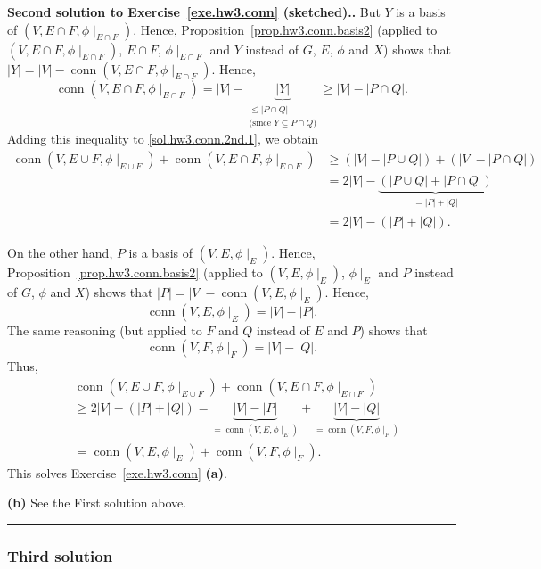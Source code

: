 \documentclass[numbers=enddot,12pt,final,onecolumn,notitlepage]{scrartcl}%
\theoremstyle{definition}
\newenvironment{proof}[1][Proof]{\noindent\textbf{#1.} }{\ \rule{0.5em}{0.5em}}
\newcommand{\conn}{\operatorname{conn}}
\newcommand{\abs}[1]{\left| #1 \right|}
\newcommand{\tup}[1]{\left( #1 \right)}
\newcommand{\underbrack}[2]{\underbrace{#1}_{\substack{#2}}}
\begin{document}
\begin{proof}[Second solution to Exercise~\ref{exe.hw3.conn}
 (sketched).]
But $Y$ is a basis of $\tup{V, E \cap F, \phi\mid_{E \cap F}}$.
Hence, Proposition~\ref{prop.hw3.conn.basis2} (applied to
$\tup{V, E \cap F, \phi\mid_{E \cap F}}$, $E \cap F$,
$\phi\mid_{E \cap F}$ and $Y$ instead of $G$,
$E$, $\phi$ and $X$) shows that
$\abs{Y} = \abs{V} - \conn \tup{V, E \cap F, \phi\mid_{E \cap F}}$.
Hence,
\[
\conn \tup{V, E \cap F, \phi\mid_{E \cap F}}
= \abs{V} - \underbrack{\abs{Y}}
                       {\leq \abs{P \cap Q} \\
                        \text{(since } Y \subseteq P \cap Q \text{)}}
\geq \abs{V} - \abs{P \cap Q} .
\]
Adding this inequality to \eqref{sol.hw3.conn.2nd.1}, we obtain
\begin{align*}
\conn \tup{V, E \cup F, \phi\mid_{E \cup F}}
+ \conn \tup{V, E \cap F, \phi\mid_{E \cap F}}
&\geq \tup{ \abs{V} - \abs{P \cup Q} }
      + \tup{ \abs{V} - \abs{P \cap Q} } \\
&= 2 \abs{V} - \underbrack{\tup{ \abs{P \cup Q} + \abs{P \cap Q} }}
                          {= \abs{P} + \abs{Q}} \\
&= 2 \abs{V} - \tup{\abs{P} + \abs{Q}} .
\end{align*}

On the other hand, $P$ is a basis of $\tup{V, E, \phi\mid_E}$.
Hence, Proposition~\ref{prop.hw3.conn.basis2} (applied to
$\tup{V, E, \phi\mid_E}$, $\phi\mid_E$ and $P$ instead of $G$,
$\phi$ and $X$) shows that
$\abs{P} = \abs{V} - \conn \tup{V, E, \phi\mid_E}$.
Hence,
\[
\conn \tup{V, E, \phi\mid_E} = \abs{V} - \abs{P} .
\]
The same reasoning (but applied to $F$ and $Q$ instead of $E$
and $P$) shows that
\[
\conn \tup{V, F, \phi\mid_F} = \abs{V} - \abs{Q} .
\]
Thus,
\begin{align*}
& \conn \tup{V, E \cup F, \phi\mid_{E \cup F}}
+ \conn \tup{V, E \cap F, \phi\mid_{E \cap F}} \\
&\geq 2 \abs{V} - \tup{\abs{P} + \abs{Q}}
= \underbrace{\abs{V} - \abs{P}}_{= \conn \tup{V, E, \phi\mid_E}}
  + \underbrace{\abs{V} - \abs{Q}}_{= \conn \tup{V, F, \phi\mid_F}}
\\
&= \conn \tup{V, E, \phi\mid_E}
+ \conn \tup{V, F, \phi\mid_F} .
\end{align*}
This solves Exercise~\ref{exe.hw3.conn} \textbf{(a)}.

\textbf{(b)} See the First solution above.
\end{proof}

\subsubsection{Third solution}
\end{document}
